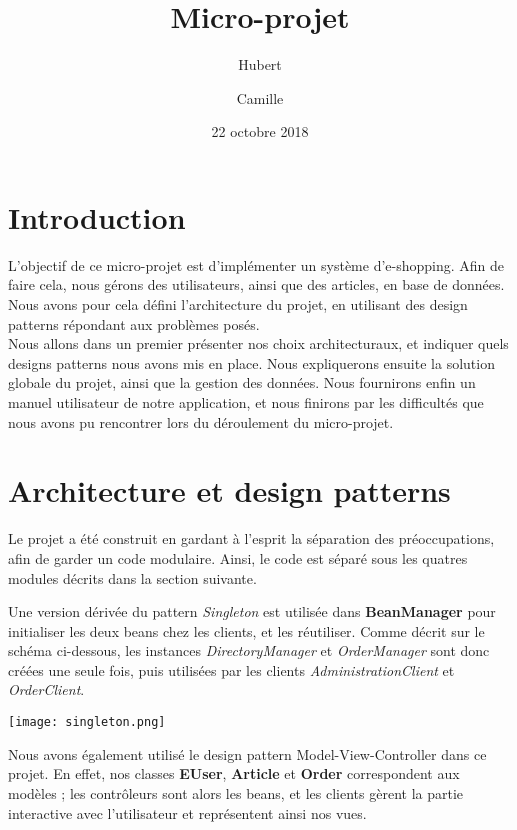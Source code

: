 \documentclass[12pt]{article}
\title{Micro-projet}
\author{Hubert \bsc{Hirtz} \and Camille \bsc{Schnell}}
\date{22 octobre 2018}
\begin{document}
\maketitle
\renewcommand{\contentsname}{Sommaire}
\tableofcontents
\newpage
\section{Introduction}
  L'objectif de ce micro-projet est d'implémenter un système d'e-shopping. Afin de faire cela, nous gérons des utilisateurs, ainsi que des articles, en base de données. Nous avons pour cela défini l'architecture du projet, en utilisant des design patterns répondant aux problèmes posés. \\
  Nous allons dans un premier présenter nos choix architecturaux, et indiquer quels designs patterns nous avons mis en place. Nous expliquerons ensuite la solution globale du projet, ainsi que la gestion des données. Nous fournirons enfin un manuel utilisateur de notre application, et nous finirons par les difficultés que nous avons pu rencontrer lors du déroulement du micro-projet.
\newpage
\section{Architecture et design patterns}

Le projet a été construit en gardant à l'esprit la séparation des préoccupations, afin de garder un code modulaire.
Ainsi, le code est séparé sous les quatres modules décrits dans la section suivante.

Une version dérivée du pattern \textit{Singleton} est utilisée dans \textbf{BeanManager} pour initialiser les deux beans chez les clients, et les réutiliser. Comme décrit sur le schéma ci-dessous, les instances \textit{DirectoryManager} et \textit{OrderManager} sont donc créées une seule fois, puis utilisées par les clients \textit{AdministrationClient} et \textit{OrderClient}.

\begin{center}
\texttt{[image: singleton.png]}
\end{center}

\newpage
Nous avons également utilisé le design pattern Model-View-Controller dans ce projet. En effet, nos classes \textbf{EUser}, \textbf{Article} et \textbf{Order} correspondent aux modèles ; les contrôleurs sont alors les beans, et les clients gèrent la partie interactive avec l'utilisateur et représentent ainsi nos vues.
\end{document}
